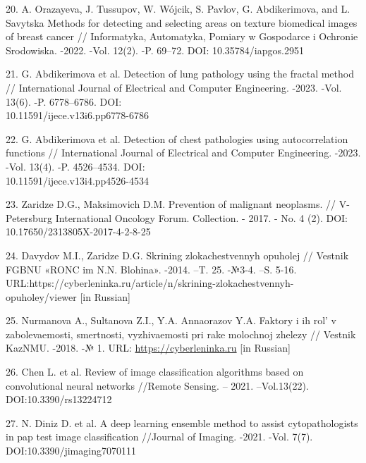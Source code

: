 \begin{references}
20. A. Orazayeva, J. Tussupov, W. Wójcik, S. Pavlov, G. Abdikerimova,
and L. Savytska Methods for detecting and selecting areas on texture
biomedical images of breast cancer // Informatyka, Automatyka, Pomiary w
Gospodarce i Ochronie Srodowiska. -2022. -Vol. 12(2). -P. 69--72. DOI:
10.35784/iapgos.2951

21. G. Abdikerimova et al. Detection of lung pathology using the fractal
method // International Journal of Electrical and Computer Engineering.
-2023. -Vol. 13(6). -P. 6778--6786. DOI:
\\10.11591/ijece.v13i6.pp6778-6786

22. G. Abdikerimova et al. Detection of chest pathologies using
autocorrelation functions // International Journal of Electrical and
Computer Engineering. -2023. -Vol. 13(4). -P. 4526--4534. DOI:
\\ 10.11591/ijece.v13i4.pp4526-4534

23. Zaridze D.G., Maksimovich D.M. Prevention of malignant neoplasms. //
V-Petersburg International Oncology Forum. Collection. - 2017. - No. 4
(2). DOI: 10.17650/2313805X-2017-4-2-8-25

24. Davydov M.I., Zaridze D.G. Skrining zlokachestvennyh opuholej //
Vestnik FGBNU «RONC im N.N. Blohina». -2014. --T. 25. -№3-4. --S. 5-16.
URL:https://cyberleninka.ru/article/n/skrining-zlokachestvennyh-opuholey/viewer
{[}in Russian{]}

25. Nurmanova A., Sultanova Z.I., Y.A. Annaorazov Y.A. Faktory i ih
rol'{} v zabolevaemosti, smertnosti, vyzhivaemosti pri
rake molochnoj zhelezy // Vestnik KazNMU. -2018. -№ 1. URL:
\href{https://cyberleninka.ru/article/n/faktory-i-ih-rol-v-zabolevaemosti-smertnosti-vyzhivaemosti-pri-rake-molochnoy-zhelezy/viewer}{https://cyberleninka.ru}
{[}in Russian{]}

26. Chen L. et al. Review of image classification algorithms based on
convolutional neural networks //Remote Sensing. -- 2021. --Vol.13(22).
DOI:10.3390/rs13224712

27. N. Diniz D. et al. A deep learning ensemble method to assist
cytopathologists in pap test image classification //Journal of Imaging.
-2021. -Vol. 7(7). DOI:10.3390/jimaging7070111
\end{references}

